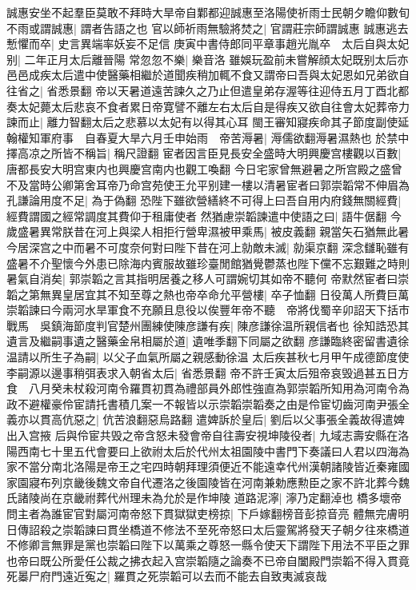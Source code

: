 誠惠安坐不起羣臣莫敢不拜時大旱帝自鄴都迎誠惠至洛陽使祈雨士民朝夕瞻仰數旬不雨或謂誠惠|{
	謂者告語之也}
官以師祈雨無驗將焚之|{
	官謂莊宗師謂誠惠}
誠惠逃去慙懼而卒|{
	史言異端率妖妄不足信}
庚寅中書侍郎同平章事趙光胤卒　太后自與太妃别|{
	二年正月太后離晉陽}
常忽忽不樂|{
	樂音洛}
雖娛玩盈前未嘗解顔太妃既别太后亦邑邑成疾太后遣中使醫藥相繼於道聞疾稍加輒不食又謂帝曰吾與太妃恩如兄弟欲自往省之|{
	省悉景翻}
帝以天暑道遠苦諫久之乃止但遣皇弟存渥等往迎侍五月丁酉北都奏太妃薨太后悲哀不食者累日帝寛譬不離左右太后自是得疾又欲自往會太妃葬帝力諫而止|{
	離力智翻太后之悲慕以太妃有以得其心耳}
閩王審知寢疾命其子節度副使延翰權知軍府事　自春夏大旱六月壬申始雨　帝苦溽暑|{
	溽儒欲翻溽暑濕熱也}
於禁中擇高凉之所皆不稱旨|{
	稱尺證翻}
宦者因言臣見長安全盛時大明興慶宫樓觀以百數|{
	唐都長安大明宫東内也興慶宫南内也觀工喚翻}
今日宅家曾無避暑之所宫殿之盛曾不及當時公卿第舍耳帝乃命宫苑使王允平别建一樓以清暑宦者曰郭崇韜常不伸眉為孔謙論用度不足|{
	為于偽翻}
恐陛下雖欲營繕終不可得上曰吾自用内府錢無關經費|{
	經費謂國之經常調度其費仰于租庸使者}
然猶慮崇韜諫遣中使語之曰|{
	語牛倨翻}
今歲盛暑異常朕昔在河上與梁人相拒行營卑濕被甲乘馬|{
	被皮義翻}
親當矢石猶無此暑今居深宫之中而暑不可度奈何對曰陛下昔在河上勍敵未滅|{
	勍渠京翻}
深念讎恥雖有盛暑不介聖懷今外患已除海内賓服故雖珍臺閒館猶覺鬱蒸也陛下儻不忘艱難之時則暑氣自消矣|{
	郭崇韜之言其指明居養之移人可謂婉切其如帝不聽何}
帝默然宦者曰崇韜之第無異皇居宜其不知至尊之熱也帝卒命允平營樓|{
	卒子恤翻}
日役萬人所費巨萬崇韜諫曰今兩河水旱軍食不充願且息役以俟豐年帝不聽　帝將伐蜀辛卯詔天下括市戰馬　吳鎮海節度判官楚州團練使陳彦謙有疾|{
	陳彦謙徐温所親信者也}
徐知誥恐其遺言及繼嗣事遺之醫藥金帛相屬於道|{
	遺唯季翻下同屬之欲翻}
彦謙臨終密留書遺徐温請以所生子為嗣|{
	以父子血氣所屬之親感動徐温}
太后疾甚秋七月甲午成德節度使李嗣源以邊事稍弭表求入朝省太后|{
	省悉景翻}
帝不許壬寅太后殂帝哀毁過甚五日方食　八月癸未杖殺河南令羅貫初貫為禮部員外郎性強直為郭崇韜所知用為河南令為政不避權豪伶宦請托書積几案一不報皆以示崇韜崇韜奏之由是伶宦切齒河南尹張全義亦以貫高伉惡之|{
	伉苦浪翻惡烏路翻}
遣婢訴於皇后|{
	劉后以父事張全義故得遣婢出入宫掖}
后與伶宦共毁之帝含怒未發會帝自往壽安視坤陵役者|{
	九域志壽安縣在洛陽西南七十里五代會要曰上欲祔太后於代州太祖園陵中書門下奏議曰人君以四海為家不當分南北洛陽是帝王之宅四時朝拜理須便近不能遠幸代州漢朝諸陵皆近秦雍國家園寢布列京畿後魏文帝自代遷洛之後園陵皆在河南兼勅應勲臣之家不許北葬今魏氏諸陵尚在京畿祔葬代州理未為允於是作坤陵}
道路泥濘|{
	濘乃定翻淖也}
橋多壞帝問主者為誰宦官對屬河南帝怒下貫獄獄吏榜掠|{
	下戶嫁翻榜音彭掠音亮}
體無完膚明日傳詔殺之崇韜諫曰貫坐橋道不修法不至死帝怒曰太后靈駕將發天子朝夕往來橋道不修卿言無罪是黨也崇韜曰陛下以萬乘之尊怒一縣令使天下謂陛下用法不平臣之罪也帝曰既公所愛任公裁之拂衣起入宫崇韜隨之論奏不已帝自闔殿門崇韜不得入貫竟死㬥尸府門遠近寃之|{
	羅貫之死崇韜可以去而不能去自致夷滅哀哉}
